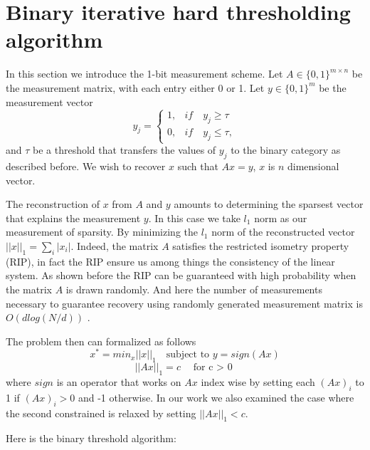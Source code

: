 \section{Binary iterative hard thresholding algorithm} 
In this section we introduce the 1-bit measurement scheme. Let $ A \in \{0,1\}^{m \times n} $ be the measurement matrix, with each entry either 0 or 1. Let $ y \in \{0,1\}^m $ be the measurement vector 
\begin{equation*}\label{key}
y_j = \begin{cases}
1, & if \quad y_j \geq \tau \\
0, & if \quad y_j \leq \tau, 
\end{cases}
\end{equation*} 
and  $ \tau $ be a threshold that transfers the values of $ y_j$ to the binary category as described before. We wish to recover $ x $ such that $ Ax = y  $, $ x $ is $ n $ dimensional vector. 

The reconstruction of $ x $ from $ A $ and $ y $ amounts to determining the sparsest vector that explains the measurement $ y $. In this case we take $ l_1 $ norm as our measurement of sparsity. By minimizing the $ l_1 $ norm of the reconstructed vector $ ||x||_1  = \sum_{i}^{}|x_i|$. Indeed, the matrix $ A $ satisfies the restricted isometry property (RIP), in fact the RIP ensure us among things the consistency of the linear system. As shown before the RIP can be guaranteed with high probability when the matrix $ A $ is drawn randomly. And here the number of measurements necessary to guarantee recovery using randomly generated measurement matrix is $ O(dlog(N/d)) $ \cite{binary}. 

The problem then can formalized as follows \begin{equation}
x^* = min_x ||x||_1 \quad \text{subject to } y = sign(Ax) \end{equation}
\begin{equation*} ||Ax||_1 = c \quad \text{for c $>$ 0}
\end{equation*}  where $ sign $ is an operator that works on $ Ax $ index wise by setting each $(Ax)_i$ to 1 if $ (Ax)_i > 0$ and -1 otherwise. In our work we also examined the case where the second constrained is relaxed by setting  $ ||Ax||_1 < c $.  

Here is the binary threshold algorithm: 

